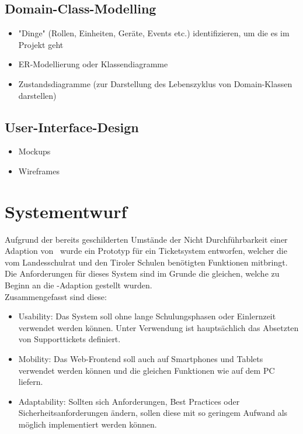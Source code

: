 



\newpage
\section{Domain-Class-Modelling}
\begin{itemize}
	\item "Dinge" (Rollen, Einheiten, Geräte, Events etc.) identifizieren, um die es im Projekt geht
	\item ER-Modellierung oder Klassendiagramme
	\item Zustandsdiagramme (zur Darstellung des Lebenszyklus von Domain-Klassen darstellen)
\end{itemize}

\newpage
\section{User-Interface-Design}
\begin{itemize}
	\item Mockups
	\item Wireframes
\end{itemize}


\chapter{Systementwurf}

\def \currentAuthor{Jakob Tomasi}

Aufgrund der bereits geschilderten Umstände der Nicht Durchführbarkeit einer Adaption von \getOst\ wurde ein Prototyp für ein Ticketsystem entworfen, welcher die vom Landesschulrat und den Tiroler Schulen benötigten Funktionen mitbringt. Die Anforderungen für dieses System sind im Grunde die gleichen, welche zu Beginn an die \getOst-Adaption gestellt wurden. 
\\
Zusammengefasst sind diese:

\begin{itemize}
	\item Usability: Das System soll ohne lange Schulungsphasen oder Einlernzeit verwendet werden können. Unter Verwendung ist hauptsächlich das Absetzten von Supporttickets definiert.
	\item Mobility: Das Web-Frontend soll auch auf Smartphones und Tablets verwendet werden können und die gleichen Funktionen wie auf dem PC liefern.
	\item Adaptability: Sollten sich Anforderungen, Best Practices oder Sicherheitsanforderungen ändern, sollen diese mit so geringem Aufwand als möglich implementiert werden können.
\end{itemize}


